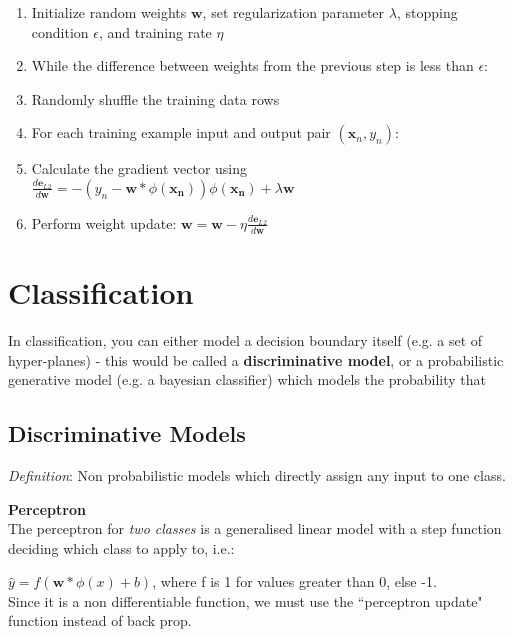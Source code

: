 \documentclass[a4paper]{article}
\begin{document}
	\begin{enumerate}
	
	\item Initialize random weights $\pmb{w}$, set regularization parameter $\lambda$, stopping condition $\epsilon$, and training rate $\eta$
	\item While the difference between weights from the previous step is less than $\epsilon$:
	
	\setlength{\itemindent}{2em}
	\item Randomly shuffle the training data rows
	\item For each training example input and output pair $(\pmb{x}_n, y_n)$:
	
	\setlength{\itemindent}{4em}
	\item Calculate the gradient vector using \newline  
	$\frac{d\pmb{e}_{L2}}{d\pmb{w}} = -(y_n - \pmb{w} * \phi(\pmb{x_n}))\phi(\pmb{x_n}) + \lambda\pmb{w}$
	
	\item Perform weight update: $\pmb{w} = \pmb{w} - \eta \frac{d\pmb{e}_{L2}}{d\pmb{w}}$
    
   
	\end{enumerate}
	
	\clearpage
	\section{Classification} \cite{elements}
	
	In classification, you can either model a decision boundary itself (e.g. a set of hyper-planes) - this would be called a \textbf{discriminative model}, or a probabilistic generative model (e.g. a bayesian classifier) which models the probability that 
	
	\subsection{Discriminative Models}
	\textit{Definition}: Non probabilistic models which directly assign any input to one class.
	
	\textbf{Perceptron} \\
	The perceptron for \textit{two classes} is a generalised linear model with a step function deciding which class to apply to, i.e.:
	
	$\hat{y} = f(\mathbf{w} * \phi(x) + b)$, where f is 1 for values greater than 0, else -1. \\
	Since it is a non differentiable function, we must use the ``perceptron update" function instead of back prop. 
	
\end{document}
